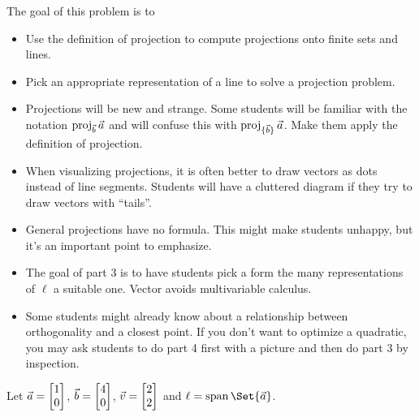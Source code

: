 	\question
	\begin{annotation}
		\begin{goals}

			The goal of this problem is to
			\begin{itemize}
				\item Use the definition of projection to compute projections onto finite sets and lines.
				\item Pick an appropriate representation of a line to solve a projection problem.
			\end{itemize}
		\end{goals}
		\begin{notes}
			\begin{itemize}
				\item Projections will be new and strange. Some students will be familiar with
					the notation $\operatorname{proj}_{\vec b}\vec a$ and will confuse this
					with $\operatorname{proj}_{\{\vec b\}}\vec a$. Make them apply the definition of projection.
				\item When visualizing projections, it is often better to draw vectors as dots instead
					of line segments. Students will have a cluttered diagram if they try to
					draw vectors with ``tails''.
				\item General projections have no formula. This might make students unhappy, but it's an
					important point to emphasize.
				\item The goal of part 3 is to have students pick a form the many representations of $\ell$
					a suitable one. Vector avoids multivariable calculus.

				\item Some students might already know about a relationship between orthogonality and
					a closest point. If you don't want to optimize a quadratic,
					you may ask students to do part 4 first with a picture and then do part 3 by inspection.
			\end{itemize}
		\end{notes}
	\end{annotation}
	Let $\vec a=\mat{1\\0}$, $\vec b=\mat{4\\0}$, $\vec v=\mat{2\\2}$ and
	$\ell=\Span\Set{\vec a}$.
